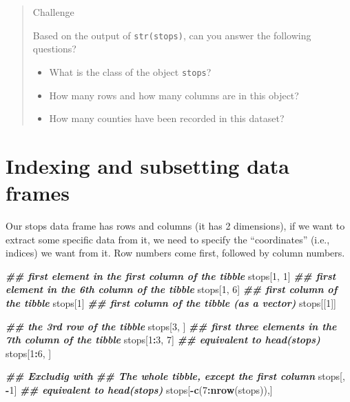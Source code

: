 \documentclass[
]{book}
\newenvironment{Shaded}{\begin{snugshade}}{\end{snugshade}}
\newcommand{\DecValTok}[1]{\textcolor[rgb]{0.00,0.00,0.81}{#1}}
\newcommand{\DocumentationTok}[1]{\textcolor[rgb]{0.56,0.35,0.01}{\textbf{\textit{#1}}}}
\newcommand{\FunctionTok}[1]{\textcolor[rgb]{0.13,0.29,0.53}{\textbf{#1}}}
\newcommand{\NormalTok}[1]{#1}
\newcommand{\SpecialCharTok}[1]{\textcolor[rgb]{0.81,0.36,0.00}{\textbf{#1}}}
\providecommand{\tightlist}{%
  \setlength{\itemsep}{0pt}\setlength{\parskip}{0pt}}
\begin{document}
\begin{quote}
Challenge

Based on the output of \texttt{str(stops)}, can you answer the following questions?

\begin{itemize}
\tightlist
\item
  What is the class of the object \texttt{stops}?
\item
  How many rows and how many columns are in this object?
\item
  How many counties have been recorded in this dataset?
\end{itemize}
\end{quote}

\section{Indexing and subsetting data frames}\label{indexing-and-subsetting-data-frames}

Our stops data frame has rows and columns (it has 2 dimensions), if we want to
extract some specific data from it, we need to specify the ``coordinates'' (i.e., indices) we want from it. Row numbers come first, followed by column numbers.

\begin{Shaded}
\begin{Highlighting}[]
\DocumentationTok{\#\# first element in the first column of the tibble}
\NormalTok{stops[}\DecValTok{1}\NormalTok{, }\DecValTok{1}\NormalTok{]}
\DocumentationTok{\#\# first element in the 6th column of the tibble }
\NormalTok{stops[}\DecValTok{1}\NormalTok{, }\DecValTok{6}\NormalTok{]}
\DocumentationTok{\#\# first column of the tibble}
\NormalTok{stops[}\DecValTok{1}\NormalTok{]}
\DocumentationTok{\#\# first column of the tibble (as a vector)}
\NormalTok{stops[[}\DecValTok{1}\NormalTok{]]}

\DocumentationTok{\#\# the 3rd row of the tibble}
\NormalTok{stops[}\DecValTok{3}\NormalTok{, ]}
\DocumentationTok{\#\# first three elements in the 7th column of the tibble}
\NormalTok{stops[}\DecValTok{1}\SpecialCharTok{:}\DecValTok{3}\NormalTok{, }\DecValTok{7}\NormalTok{]}
\DocumentationTok{\#\# equivalent to head(stops) }
\NormalTok{stops[}\DecValTok{1}\SpecialCharTok{:}\DecValTok{6}\NormalTok{, ]}

\DocumentationTok{\#\# Excludig with \textquotesingle{}{-}\textquotesingle{}}
\DocumentationTok{\#\# The whole tibble, except the first column}
\NormalTok{stops[, }\SpecialCharTok{{-}}\DecValTok{1}\NormalTok{]          }
\DocumentationTok{\#\# equivalent to head(stops)  }
\NormalTok{stops[}\SpecialCharTok{{-}}\FunctionTok{c}\NormalTok{(}\DecValTok{7}\SpecialCharTok{:}\FunctionTok{nrow}\NormalTok{(stops)),]}
\end{Highlighting}
\end{Shaded}
\end{document}
